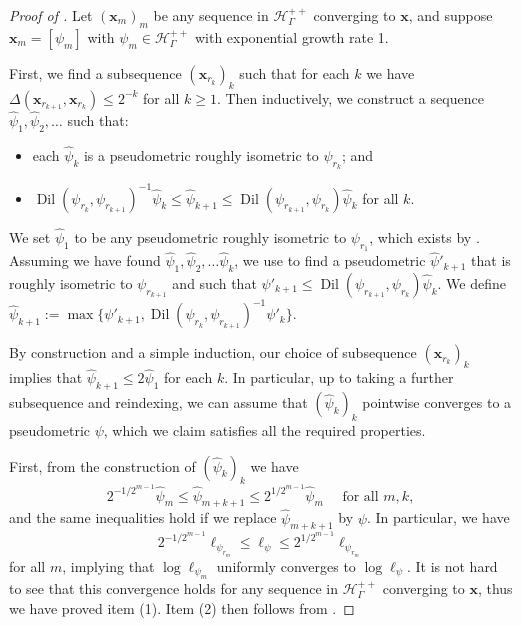 \documentclass[twoside]{amsart}
\theoremstyle{definition}
\numberwithin{equation}{section}
\numberwithin{theorem}{section}
\newcommand{\calH}{\mathcal{H}}
\newcommand{\scrH}{\mathscr{H}}
\newcommand{\G}{\Gamma}
\newcommand{\Del}{\Delta}
\newcommand{\p}{\psi}
\DeclareMathOperator{\Dil}{Dil}
\newcommand{\vx}{\mathbf{x}}
\begin{document}
\begin{proof}[Proof of ]
    Let $(\vx_m)_m$ be any sequence in $\scrH_\G^{++}$ converging to $\vx$, and suppose $\vx_m=[\p_m]$ with $\p_m\in \calH_\G^{++}$ with exponential growth rate 1. 
    
    First, we find a subsequence $(\vx_{r_k})_k$ such that for each $k$ we have $\Del(\vx_{r_{k+1}},\vx_{r_k})\leq 2^{-k}$ for all $k\geq 1$. Then inductively, we construct a sequence $\hat\p_{1},\hat\p_2,\dots$ such that:
    \begin{itemize}
        \item each $\hat\p_k$ is a pseudometric roughly isometric to $\p_{r_k}$; and
        \item $\Dil(\p_{r_k},\p_{r_{k+1}})^{-1}\hat\p_{k}\leq \hat\p_{k+1}\leq  \Dil(\p_{r_{k+1}},\p_{r_k})\hat\p_k$ for all $k$.
    \end{itemize}
    We set $\hat\p_{1}$ to be any pseudometric roughly isometric to $\p_{r_1}$, which exists by . Assuming we have found $\hat\p_{1},\hat\p_{2},\dots \hat\p_{k}$, we use  to find a pseudometric $\hat \p'_{k+1}$ that is roughly isometric to $\p_{r_{k+1}}$ and such that $\p'_{k+1}\leq \Dil(\p_{r_{k+1}},\p_{r_k})\hat\p_{k}$. We define $\hat\p_{k+1}:=\max\{\p'_{k+1},\Dil(\p_{r_{k}},\p_{r_{k+1}})^{-1}\p'_{k}\}.$

    By construction and a simple induction, our choice of subsequence $(\vx_{r_k})_k$ implies that $\hat\p_{k+1}\leq 2\hat\p_1$ for each $k$. In particular, up to taking a further subsequence and reindexing, we can assume that $(\hat\p_k)_k$ pointwise converges to a pseudometric $\p$, which we claim satisfies all the required properties.

    First, from the construction of $(\hat\p_k)_k$ we have
    \begin{equation}\label{eq:QIhatpsi}
        2^{-1/2^{m-1}}\hat\p_{m}\leq \hat\p_{m+k+1}\leq 2^{1/2^{m-1}}\hat\p_m \quad \text{ for all }m,k,
    \end{equation}
 and the same inequalities hold if we replace $\hat\p_{m+k+1}$ by $\p$. In particular, we have 
    \[2^{-1/2^{m-1}}\ell_{\p_{r_m}}\leq \ell_\p\leq 2^{1/2^{m-1}}\ell_{\p_{r_m}}\]
    for all $m$, implying that $\log\ell_{\p_m}$  uniformly converges to $\log\ell_\p$. It is not hard to see that this convergence holds for any sequence in $\scrH_\G^{++}$ converging to $\vx$, thus we have proved item (1). Item (2) then follows from . %
\end{proof}
\end{document}
